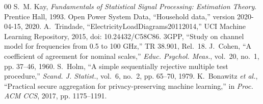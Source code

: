 \documentclass[conference]{IEEEtran}
\begin{document}
\begin{thebibliography}{00}
 S.~M. Kay, \emph{Fundamentals of Statistical Signal Processing: Estimation Theory}. Prentice Hall, 1993.
 Open Power System Data, ``Household data,'' version 2020-04-15, 2020.
 A.~Trindade, ``ElectricityLoadDiagrams20112014,'' UCI Machine Learning Repository, 2015, doi: 10.24432/C58C86.
 3GPP, ``Study on channel model for frequencies from 0.5 to 100 GHz,'' TR 38.901, Rel.~18.
 J.~Cohen, ``A coefficient of agreement for nominal scales,'' \emph{Educ. Psychol. Meas.}, vol.~20, no.~1, pp. 37--46, 1960.
 S.~Holm, ``A simple sequentially rejective multiple test procedure,'' \emph{Scand. J. Statist.}, vol.~6, no.~2, pp. 65--70, 1979.
 K.~Bonawitz \emph{et al.}, ``Practical secure aggregation for privacy-preserving machine learning,'' in \emph{Proc. ACM CCS}, 2017, pp. 1175--1191.
\end{thebibliography}
\end{document}
